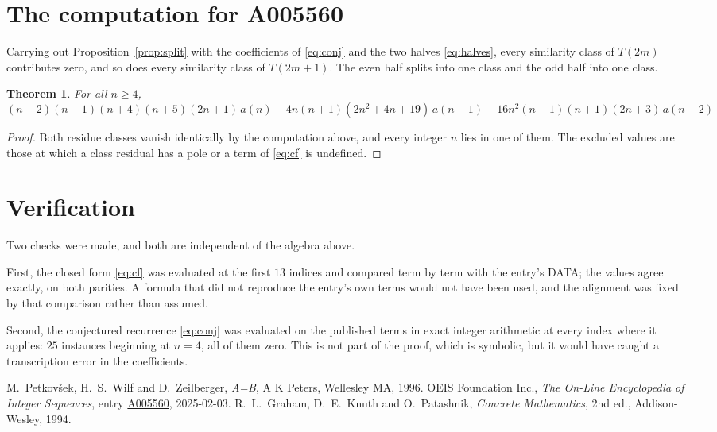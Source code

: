 \documentclass[11pt,a4paper]{article}
\theoremstyle{plain}
\newtheorem{theorem}{Theorem}
\theoremstyle{definition}
\begin{document}
\section{The computation for A005560}

Carrying out Proposition~\ref{prop:split} with the coefficients of \eqref{eq:conj} and the
two halves \eqref{eq:halves}, every similarity class of $T(2m)$ contributes zero, and so
does every similarity class of $T(2m+1)$. The even half splits into one class
and the odd half into one class.

\begin{theorem}
For all $n\ge 4$,
\[
\left(n - 2\right) \left(n - 1\right) \left(n + 4\right) \left(n + 5\right) \left(2 n + 1\right)\,a(n) -  4 n \left(n + 1\right) \left(2 n^{2} + 4 n + 19\right)\,a(n-1) -  16 n^{2} \left(n - 1\right) \left(n + 1\right) \left(2 n + 3\right)\,a(n-2)
\]
\end{theorem}

\begin{proof}
Both residue classes vanish identically by the computation above, and every integer $n$
lies in one of them. The excluded values are those at which a class residual has a pole or
a term of \eqref{eq:cf} is undefined.
\end{proof}

\section{Verification}

Two checks were made, and both are independent of the algebra above.

First, the closed form \eqref{eq:cf} was evaluated at the first $13$ indices and
compared term by term with the entry's DATA; the values agree exactly, on both parities. A
formula that did not reproduce the entry's own terms would not have been used, and the
alignment was fixed by that comparison rather than assumed.

Second, the conjectured recurrence \eqref{eq:conj} was evaluated on the published terms in
exact integer arithmetic at every index where it applies: $25$ instances beginning at
$n=4$, all of them zero. This is not part of the proof, which is symbolic, but it
would have caught a transcription error in the coefficients.

\begin{thebibliography}{9}
 M.~Petkov\v{s}ek, H.~S.~Wilf and D.~Zeilberger, \emph{A=B}, A K Peters,
Wellesley MA, 1996.
 OEIS Foundation Inc., \emph{The On-Line Encyclopedia of Integer Sequences},
entry \href{https://oeis.org/A005560}{A005560}, 2025-02-03.
 R.~L.~Graham, D.~E.~Knuth and O.~Patashnik, \emph{Concrete Mathematics},
2nd ed., Addison-Wesley, 1994.
\end{thebibliography}
\end{document}

